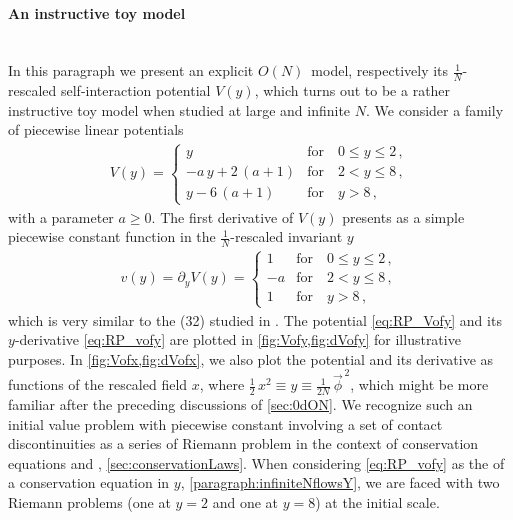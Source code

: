 \paragraph{An instructive toy model}\label{paragraph:RP}\mbox{}\\%
In this paragraph we present an explicit $O(N)$~model, respectively its $\frac{1}{N}$-rescaled self-interaction potential $V(y)$, which turns out to be a rather instructive toy model when studied at large and infinite $N$. We consider a family of piecewise linear potentials
	\begin{align}
		V ( y ) =
		\begin{cases}
			y							&	\text{for} \quad 0 \leq y \leq 2 \, ,\\
			- a \, y + 2 \, ( a + 1 )	&	\text{for} \quad 2 < y \leq 8 \, ,\\
			y - 6 \, ( a + 1 )			&	\text{for} \quad y>8 \, ,
		\end{cases}	\label{eq:RP_Vofy}
	\end{align}
with a parameter $a\geq0$. The first derivative of $V ( y )$ presents as a simple piecewise constant function in the $\tfrac{1}{N}$-rescaled invariant $y$
	\begin{align}
	v ( y ) = \partial_y V ( y ) =
	\begin{cases}
		1	&	\text{for} \quad 0 \leq y \leq 2 \, ,\\
		- a	&	\text{for} \quad 2 < y \leq 8 \, ,\\
		1	&	\text{for} \quad y>8 \, ,
	\end{cases}	\label{eq:RP_vofy}
\end{align}
which is very similar to the \ic{} (32) studied in . The potential \eqref{eq:RP_Vofy} and its $y$-derivative \eqref{eq:RP_vofy} are plotted in \cref{fig:Vofy,fig:dVofy} for illustrative purposes.
In \cref{fig:Vofx,fig:dVofx}, we also plot the potential and its derivative as functions of the rescaled field $x$, where $\tfrac{1}{2} \, x^2 \equiv y\equiv \tfrac{1}{2N} \, \vec{\phi}^{\, 2}$, which might be more familiar after the preceding discussions of \cref{sec:0dON}.
We recognize such an initial value problem with piecewise constant \ics{} involving a set of contact discontinuities as a series of Riemann problem in the context of conservation equations and \cfd{}, \cf{} \cref{sec:conservationLaws}.
When considering \cref{eq:RP_vofy} as the \ic{} of a conservation equation in $y$, \cf{} \cref{paragraph:infiniteNflowsY}, we are faced with two Riemann problems (one at $y=2$ and one at $y=8$) at the \uv{} initial scale.

